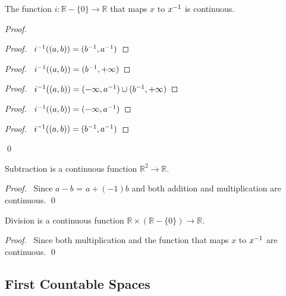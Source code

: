 \begin{prop}
\label{prop:inverse_continuous}
The function $i : \mathbb{R} - \{0\} \rightarrow \mathbb{R}$ that maps $x$ to ${x}^{-1}$ is continuous.
\end{prop}

\begin{proof}
\pf
{}
\begin{proof}
	\pf\ ${i}^{-1}((a,b)) = ({b}^{-1}, {a}^{-1})$
\end{proof}
\begin{proof}
	\pf\ ${i}^{-1}((a,b)) = ({b}^{-1}, + \infty)$
\end{proof}
\begin{proof}
	\pf\ ${i}^{-1}((a,b)) = (-\infty, {a}^{-1}) \cup ({b}^{-1}, +\infty)$
\end{proof}
\begin{proof}
	\pf\ ${i}^{-1}((a,b)) = (-\infty, {a}^{-1})$
\end{proof}
\begin{proof}
	\pf\ ${i}^{-1}((a,b)) = ({b}^{-1}, {a}^{-1})$
\end{proof}
\qed
\end{proof}

\begin{prop}
Subtraction is a continuous function $\mathbb{R}^2 \rightarrow \mathbb{R}$.
\end{prop}

\begin{proof}
\pf\ Since $a-b$ = $a + (-1)b$ and both addition and multiplication are continuous. \qed
\end{proof}

\begin{prop}
Division is a continuous function $\mathbb{R} \times (\mathbb{R} - \{0\}) \rightarrow \mathbb{R}$.
\end{prop}

\begin{proof}
\pf\ Since both multiplication and the function that maps $x$ to ${x}^{-1}$ are continuous. \qed
\end{proof}

\subsection{First Countable Spaces}

